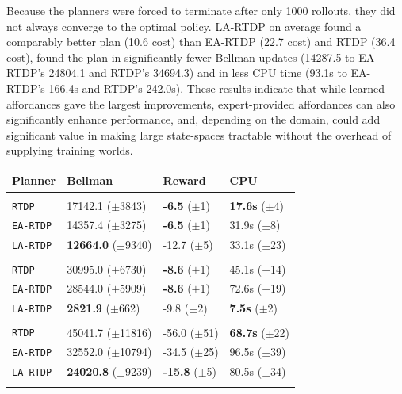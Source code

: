 \documentclass[letterpaper]{article}
\newcommand{\ra}[1]{\renewcommand{\arraystretch}{#1}} %
\begin{document}
Because the planners were forced to terminate after only 1000
rollouts, they did not always converge to the optimal policy. LA-RTDP on
average found a comparably better plan (10.6 cost) than EA-RTDP (22.7
cost) and RTDP (36.4 cost), found the plan in significantly fewer
Bellman updates (14287.5 to EA-RTDP's 24804.1 and RTDP's 34694.3) and in
less CPU time (93.1s to EA-RTDP's 166.4s and RTDP's 242.0s).  These
results indicate that while learned affordances gave the largest
improvements, expert-provided affordances can also significantly
enhance performance, and, depending on the domain, could add
significant value in making large state-spaces tractable without the
overhead of supplying training worlds.

\begin{table}[t]
\ra{1.15}
\small
\begin{tabular}{@{}llll@{}}\toprule
Planner & Bellman & Reward & CPU \\ \midrule
&\hspace{-10mm}{\it Mining Task} \\
\texttt{RTDP} & 17142.1 ($\pm$3843) 		& {\bf -6.5} ($\pm$1)  & {\bf 17.6s}   ($\pm$4) \\
\texttt{EA-RTDP} 	& 14357.4 ($\pm$3275) 		& {\bf -6.5}   ($\pm$1) & 31.9s   ($\pm$8) \\
\texttt{LA-RTDP} 	& {\bf 12664.0} ($\pm$9340) 	& -12.7 ($\pm$5) & 33.1s   ($\pm$23) \\\hline
&\hspace{-10mm}{\it Smelting Task} \\
\texttt{RTDP} 	& 30995.0 ($\pm$6730) 		& {\bf -8.6}   ($\pm$1) & 45.1s   ($\pm$14) \\
\texttt{EA-RTDP} 	& 28544.0 ($\pm$5909) 		& {\bf -8.6}   ($\pm$1) & 72.6s   ($\pm$19) \\ 
\texttt{LA-RTDP} 	& {\bf 2821.9} 	 ($\pm$662) 	& -9.8   ($\pm$2) & {\bf 7.5s}  ($\pm$2) \\ \hline
&\hspace{-10mm}{\it Wall Traversal Task} \\
\texttt{RTDP} & 45041.7 ($\pm$11816) 		& -56.0   ($\pm$51) & {\bf 68.7s}   ($\pm$22) \\
\texttt{EA-RTDP} 	& 32552.0 ($\pm$10794) 		& -34.5   ($\pm$25) & 96.5s   ($\pm$39) \\ 
\texttt{LA-RTDP} 	& {\bf 24020.8} ($\pm$9239) 	& {\bf -15.8}   ($\pm$5) & 80.5s   ($\pm$34) \\ \hline
&\hspace{-10mm}{\it Trench Traversal Task} \\

\end{tabular}
\end{table}
\end{document}
